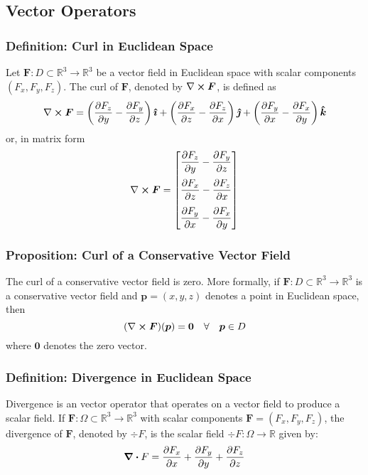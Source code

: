 \documentclass[11pt, a4paper]{article}
\begin{document}
\subsection{Vector Operators}
	
\subsubsection{Definition: Curl in Euclidean Space}
Let $ \bm{F} :  D \subset \mathbb{R}^3 \rightarrow \mathbb{R}^3 $ be a vector field in Euclidean space with scalar components $ (F_x, F_y, F_z) $. The curl of $ \bm{F} $, denoted by $ \nabla \cross \bm{F} $, is defined as
\begin{equation*}
	\nabla \cross \bm{F} =
	\left(\frac{\partial F_z}{\partial y} - \frac{\partial F_y}{\partial z}\right) \boldsymbol{\hat\imath} + \left(\frac{\partial F_x}{\partial z} - \frac{\partial F_z}{\partial x} \right) \boldsymbol{\hat\jmath} + \left(\frac{\partial F_y}{\partial x} - \frac{\partial F_x}{\partial y} \right) \boldsymbol{\hat k}
\end{equation*}
or, in matrix form
\[\nabla \cross \bm{F} =
\begin{bmatrix}\dfrac{\partial F_z}{\partial y} - \dfrac{\partial F_y}{\partial z} \\[2.5ex]
\dfrac{\partial F_x}{\partial z} - \dfrac{\partial F_z}{\partial x}\\[2.5ex]
\dfrac{\partial F_y}{\partial x} - \dfrac{\partial F_x}{\partial y}\end{bmatrix}	
\]

\subsubsection{Proposition: Curl of a Conservative Vector Field}
The curl of a conservative vector field is zero. More formally, if $ \bm{F} :  D \subset \mathbb{R}^3 \rightarrow \mathbb{R}^3 $ is a conservative vector field and $ \bm{p} = (x, y, z) $ denotes a point in Euclidean space, then
\begin{equation*}
	(\nabla \cross \bm{F})(\bm{p}) = \bm{0} \quad \forall \quad \bm{p} \in D
\end{equation*}
where $ \bm{0} $ denotes the zero vector.

\subsubsection{Definition: Divergence in Euclidean Space}
Divergence is an vector operator that operates on a vector field to produce a scalar field. If $ \bm{F} : \Omega \subset \mathbb{R}^3 \to \mathbb{R}^3 $ with scalar components $ \bm{F} = (F_x, F_y, F_z) $, the divergence of $ \bm{F} $, denoted by $ \div{F} $, is the scalar field $ \div{F} : \Omega \to \mathbb{R}$ given by:
\begin{equation*}
	\div{F} = \pdv{F_x}{x} + \pdv{F_y}{y} + \pdv{F_z}{z}
\end{equation*}
\end{document}
